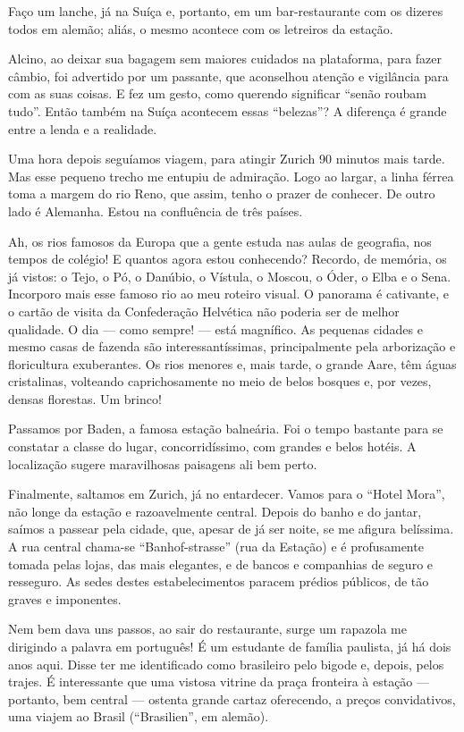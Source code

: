 Faço um lanche, já na Suíça e, portanto, em um bar-restaurante com os dizeres todos em alemão; aliás, o mesmo acontece com os letreiros da estação.

Alcino, ao deixar sua bagagem sem maiores cuidados na plataforma, para fazer câmbio, foi advertido por um passante, que aconselhou atenção e vigilância para com as suas coisas. E fez um gesto, como querendo significar ``senão roubam tudo''. Então também na Suíça acontecem essas ``belezas''? A diferença é grande entre a lenda e a realidade.

Uma hora depois seguíamos viagem, para atingir Zurich 90 minutos mais tarde. Mas esse pequeno trecho me entupiu de admiração. Logo ao largar, a linha férrea toma a margem do rio Reno, que assim, tenho o prazer de conhecer. De outro lado é Alemanha. Estou na confluência de três países.

Ah, os rios famosos da Europa que a gente estuda nas aulas de geografia, nos tempos de colégio! E quantos agora estou conhecendo? Recordo, de memória, os já vistos: o Tejo, o Pó, o Danúbio, o Vístula, o Moscou, o Óder, o Elba e o Sena. Incorporo mais esse famoso rio ao meu roteiro visual. O panorama é cativante, e o cartão de visita da Confederação Helvética não poderia ser de melhor qualidade. O dia --- como sempre! --- está magnífico. As pequenas cidades e mesmo casas de fazenda são interessantíssimas, principalmente pela arborização e floricultura exuberantes. Os rios menores e, mais tarde, o grande Aare, têm águas cristalinas, volteando caprichosamente no meio de belos bosques e, por vezes, densas florestas. Um brinco!

Passamos por Baden, a famosa estação balneária. Foi o tempo bastante para se constatar a classe do lugar, concorridíssimo, com grandes e belos hotéis. A localização sugere maravilhosas paisagens ali bem perto.

Finalmente, saltamos em Zurich, já no entardecer. Vamos para o ``Hotel Mora'', não longe da estação e razoavelmente central. Depois do banho e do jantar, saímos a passear pela cidade, que, apesar de já ser noite, se me afigura belíssima. A rua central chama-se ``Banhof-strasse'' (rua da Estação) e é profusamente tomada pelas lojas, das mais elegantes, e de bancos e companhias de seguro e resseguro. As sedes destes estabelecimentos paracem prédios públicos, de tão graves e imponentes.

Nem bem dava uns passos, ao sair do restaurante, surge um rapazola me dirigindo a palavra em português! É um estudante de família paulista, já há dois anos aqui. Disse ter me identificado como brasileiro pelo bigode e, depois, pelos trajes. É interessante que uma vistosa vitrine da praça fronteira à estação --- portanto, bem central --- ostenta grande cartaz oferecendo, a preços convidativos, uma viajem ao Brasil (``Brasilien'', em alemão).

